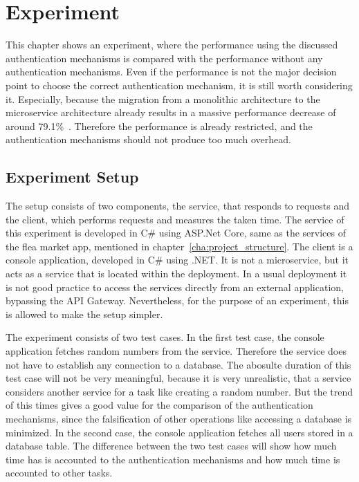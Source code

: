 \chapter{Experiment}
\label{cha:experiment}
This chapter shows an experiment, where the performance using the discussed authentication mechanisms is compared with the performance without any authentication mechanisms.
Even if the performance is not the major decision point to choose the correct authentication mechanism, it is still worth considering it.
Especially, because the migration from a monolithic architecture to the microservice architecture already results in a massive performance decrease of around 79.1\%~\cite{ueda2016workload}.
Therefore the performance is already restricted, and the authentication mechanisms should not produce too much overhead.

\section{Experiment Setup}
The setup consists of two components, the service, that responds to requests and the client, which performs requests and measures the taken time.
The service of this experiment is developed in C\# using ASP.Net Core, same as the services of the flea market app, mentioned in chapter~\ref{cha:project_structure}.
The client is a console application, developed in C\# using .NET.
It is not a microservice, but it acts as a service that is located within the deployment.
In a usual deployment it is not good practice to access the services directly from an external application, bypassing the API Gateway.
Nevertheless, for the purpose of an experiment, this is allowed to make the setup simpler. 

The experiment consists of two test cases.
In the first test case, the console application fetches random numbers from the service.
Therefore the service does not have to establish any connection to a database.
The abosulte duration of this test case will not be very meaningful, because it is very unrealistic, that a service considers another service for a task like creating a random number.
But the trend of this times gives a good value for the comparison of the authentication mechanisms, since the falsification of other operations like accessing a database is minimized.
In the second case, the console application fetches all users stored in a database table.
The difference between the two test cases will show how much time has is accounted to the authentication mechanisms and how much time is accounted to other tasks.

